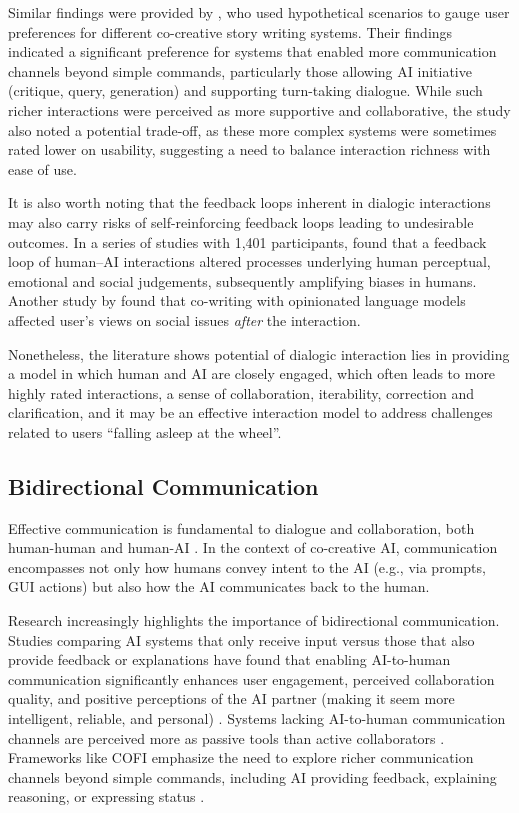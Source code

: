 Similar findings were provided by \citet{Lin2023-jd}, who used hypothetical scenarios to gauge user preferences for different co-creative story writing systems. Their findings indicated a significant preference for systems that enabled more communication channels beyond simple commands, particularly those allowing AI initiative (critique, query, generation) and supporting turn-taking dialogue. While such richer interactions were perceived as more supportive and collaborative, the study also noted a potential trade-off, as these more complex systems were sometimes rated lower on usability, suggesting a need to balance interaction richness with ease of use.

It is also worth noting that the feedback loops inherent in dialogic interactions may also carry risks of self-reinforcing feedback loops leading to undesirable outcomes. In a series of studies with 1,401 participants, \citet{Glickman2024-zh} found that a feedback loop of human–AI interactions altered processes underlying human perceptual, emotional and social judgements, subsequently amplifying biases in humans. Another study by \citet{Jakesch2023-ks} found that co-writing with opinionated language models affected user's views on social issues \textit{after} the interaction. 

Nonetheless, the literature shows potential of dialogic interaction lies in providing a model in which human and AI are closely engaged, which often leads to more highly rated interactions, a sense of collaboration, iterability, correction and clarification, and it may be an effective interaction model to address challenges related to users ``falling asleep at the wheel''.

\subsection{Bidirectional Communication}

Effective communication is fundamental to dialogue and collaboration, both human-human and human-AI \citep{Mamykina2002-lm, Rezwana2022-gg, Llano2022-ti}. In the context of co-creative AI, communication encompasses not only how humans convey intent to the AI (e.g., via prompts, GUI actions) but also how the AI communicates back to the human.

Research increasingly highlights the importance of bidirectional communication. Studies comparing AI systems that only receive input versus those that also provide feedback or explanations have found that enabling AI-to-human communication significantly enhances user engagement, perceived collaboration quality, and positive perceptions of the AI partner (making it seem more intelligent, reliable, and personal) \citep{Rezwana2023-gj, Rezwana2022-ui, Llano2022-ti}. Systems lacking AI-to-human communication channels are perceived more as passive tools than active collaborators \citep{Rezwana2023-gj}. Frameworks like COFI emphasize the need to explore richer communication channels beyond simple commands, including AI providing feedback, explaining reasoning, or expressing status \citep{Rezwana2022-gg}.


